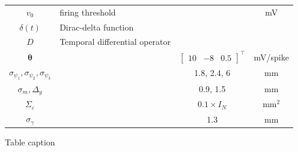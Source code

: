 \documentclass[10pt]{article}
\begin{document}
\begin{table}[!ht]
\begin{tabular}{|c|l|c|c|}
	$v_0$ & firing threshold & & mV \\
	$\delta(t)$ & Dirac-delta function & & \\
	$D$ & Temporal differential operator & &\\
	$\boldsymbol{\theta}$ & & $\left[\begin{array}{ccc}
	10 &-8 &0.5
	\end{array}
	\right]^{\top}$ & mV/spike\\
	$\sigma_{\psi_{1}}, \sigma_{\psi_{2}}, \sigma_{\psi_{3}}$ & & 1.8, 2.4, 6 & mm\\
	$\sigma_{m},\Delta_{y}$& & 0.9, 1.5 & mm\\
	$\Sigma_{\varepsilon}$ & & $0.1 \times I_{N}$ & mm$^2$ \\
	$\sigma_{\gamma}$& & 1.3 & mm\\
	\hline
\end{tabular}
\begin{flushleft}Table caption
\end{flushleft}
\label{tab:label}
\end{table}
	
\end{document}
